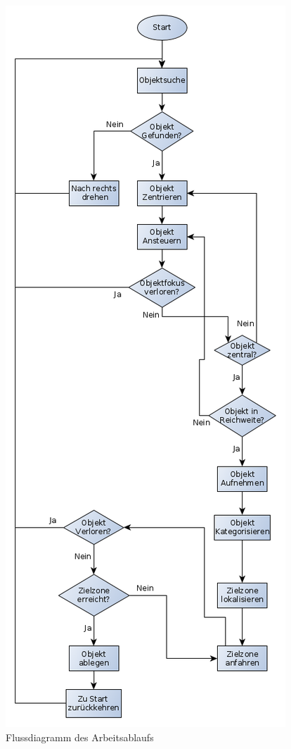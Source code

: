 \begin{figure}[H]
\centering
\includegraphics[height=\textheight]{Bilder/Workloop/Ablaufdiagramm}
\caption{Flussdiagramm des Arbeitsablaufs}
\label{fig:Ablauf}
\end{figure}

